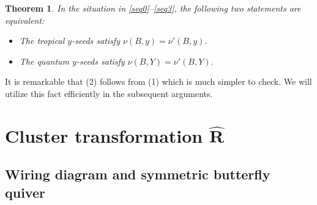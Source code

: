 \documentclass[11pt]{article}
\numberwithin{equation}{section}
\newcommand\bY{Y}
\numberwithin{equation}{section}
\newtheorem{Theorem}{Theorem}[section]
\begin{document}
\begin{Theorem}\label{thm:piv}
 In the situation in \eqref{seq0}--\eqref{seq3}, the following two
 statements are equivalent:
\begin{itemize}\itemsep=0pt

\item[$(1)$]
The tropical $y$-seeds satisfy $\nu (B,y) = \nu'(B,y)$.

\item[$(2)$]
The quantum $y$-seeds satisfy $\nu (B,\bY) = \nu'(B,\bY)$.

\end{itemize}
\end{Theorem}

It is remarkable that (2) follows from (1) which is much simpler to check.
We will utilize this fact efficiently
in the subsequent arguments.


\section[Cluster transformation R]{Cluster transformation $\boldsymbol{\widehat{R}}$}\label{s:ct}

\subsection{Wiring diagram and symmetric butterfly quiver}
\end{document}

